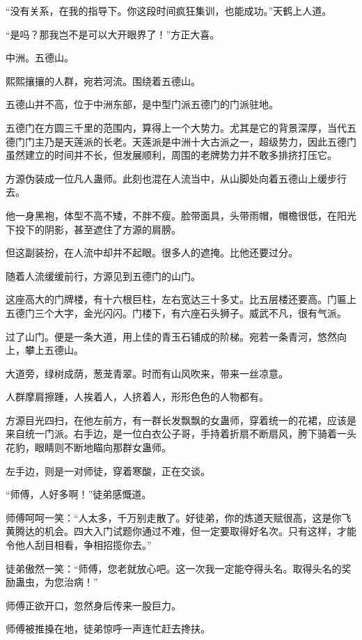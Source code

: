 \begin{this_body}
“没有关系，在我的指导下。你这段时间疯狂集训，也能成功。”天鹤上人道。

“是吗？那我岂不是可以大开眼界了！”方正大喜。

中洲。五德山。

熙熙攘攘的人群，宛若河流。围绕着五德山。

五德山并不高，位于中洲东部，是中型门派五德门的门派驻地。

五德门在方圆三千里的范围内，算得上一个大势力。尤其是它的背景深厚，当代五德门门主乃是天莲派的长老。天莲派是中洲十大古派之一，超级势力，因此五德门虽然建立的时间并不长，但发展顺利，周围的老牌势力并不敢多排挤打压它。

方源伪装成一位凡人蛊师。此刻也混在人流当中，从山脚处向着五德山上缓步行去。

他一身黑袍，体型不高不矮，不胖不瘦。脸带面具，头带雨帽，帽檐很低，在阳光下投下的阴影，甚至遮住了方源的肩膀。

但这副装扮，在人流中却并不起眼。很多人的遮掩。比他还要过分。

随着人流缓缓前行，方源见到五德门的山门。

这座高大的门牌楼，有十六根巨柱，左右宽达三十多丈。比五层楼还要高。门匾上五德门三个大字，金光闪闪。门楼下，有六座石头狮子。威武不凡，很有气派。

过了山门。便是一条大道，用上佳的青玉石铺成的阶梯。宛若一条青河，悠然向上，攀上五德山。

大道旁，绿树成荫，葱茏青翠。时而有山风吹来，带来一丝凉意。

人群摩肩擦踵，人挨着人，人挤着人，形形色色的人物都有。

方源目光四扫，在他左前方，有一群长发飘飘的女蛊师，穿着统一的花裙，应该是来自统一门派。右手边，是一位白衣公子哥，手持着折扇不断扇风，胯下骑着一头花豹，眼睛则不断地瞄向那群女蛊师。

左手边，则是一对师徒，穿着寒酸，正在交谈。

“师傅，人好多啊！”徒弟感慨道。

师傅呵呵一笑：“人太多，千万别走散了。好徒弟，你的炼道天赋很高，这是你飞黄腾达的机会。四大入门试题你通过不难，但一定要取得好名次。只有这样，才能令他人刮目相看，争相招揽你去。”

徒弟傲然一笑：“师傅，您老就放心吧。这一次我一定能夺得头名。取得头名的奖励蛊虫，为您治病！”

师傅正欲开口，忽然身后传来一股巨力。

师傅被推搡在地，徒弟惊呼一声连忙赶去搀扶。


\end{this_body}
